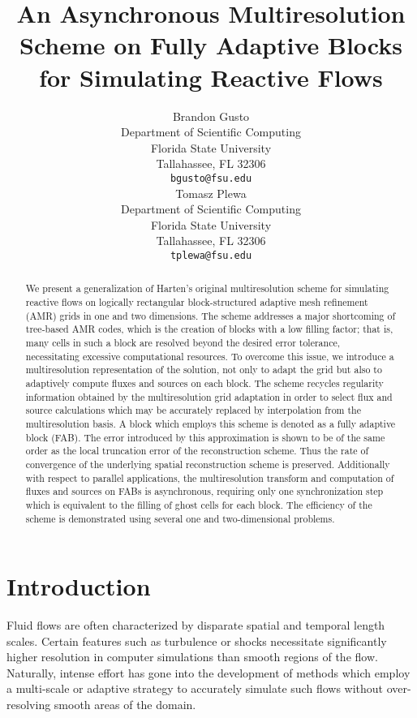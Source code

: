 \documentclass{article}
\title{An Asynchronous Multiresolution Scheme on Fully Adaptive Blocks for
Simulating Reactive Flows}
\author{
  Brandon Gusto\\
  Department of Scientific Computing\\
  Florida State University\\
  Tallahassee, FL 32306 \\
  \texttt{bgusto@fsu.edu} \\
  \And
  Tomasz Plewa \\
  Department of Scientific Computing\\
  Florida State University\\
  Tallahassee, FL 32306 \\
  \texttt{tplewa@fsu.edu} \\
}
\begin{document}
\maketitle

\begin{abstract}
    We present a generalization of Harten's original multiresolution scheme for
    simulating reactive flows on logically rectangular block-structured adaptive
    mesh refinement (AMR) grids in one and two dimensions. The scheme addresses
    a major shortcoming of tree-based AMR codes, which is the creation of blocks
    with a low filling factor; that is, many cells in such a block are resolved
    beyond the desired error tolerance, necessitating excessive computational
    resources.  To overcome this issue, we introduce a multiresolution
    representation of the solution, not only to adapt the grid but also to
    adaptively compute fluxes and sources on each block. The scheme recycles
    regularity information obtained by the multiresolution grid adaptation in
    order to select flux and source calculations which may be accurately
    replaced by interpolation from the multiresolution basis. A block which
    employs this scheme is denoted as a fully adaptive block (FAB).  The error
    introduced by this approximation is shown to be of the same order as the
    local truncation error of the reconstruction scheme. Thus the rate of
    convergence of the underlying spatial reconstruction scheme is preserved.
    Additionally with respect to parallel applications, the multiresolution
    transform and computation of fluxes and sources on FABs is asynchronous,
    requiring only one synchronization step which is equivalent to the filling
    of ghost cells for each block. The efficiency of the scheme is demonstrated
    using several one and two-dimensional problems.
\end{abstract}


\section{Introduction}

    Fluid flows are often characterized by disparate spatial and temporal length
    scales. Certain features such as turbulence or shocks necessitate
    significantly higher resolution in computer simulations than smooth regions
    of the flow.  Naturally, intense effort has gone into the development of
    methods which employ a multi-scale or adaptive strategy to accurately
    simulate such flows without over-resolving smooth areas of the domain.
\end{document}
